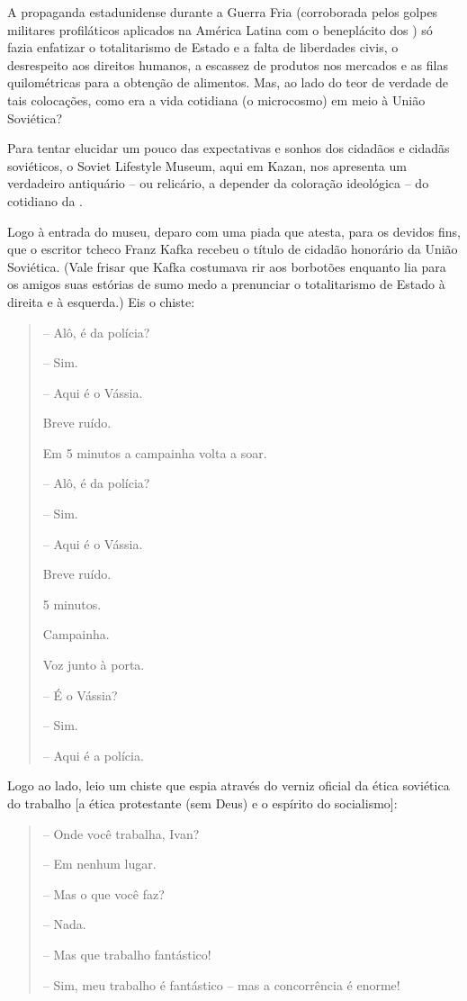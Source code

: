 A propaganda estadunidense durante a Guerra Fria (corroborada pelos
golpes militares profiláticos aplicados na América Latina com o
beneplácito dos ) só fazia enfatizar o totalitarismo de Estado e a
falta de liberdades civis, o desrespeito aos direitos humanos, a
escassez de produtos nos mercados e as filas quilométricas para a
obtenção de alimentos. Mas, ao lado do teor de verdade de tais
colocações, como era a vida cotidiana (o microcosmo) em meio à União
Soviética?

Para tentar elucidar um pouco das expectativas e sonhos dos cidadãos e
cidadãs soviéticos, o Soviet Lifestyle Museum, aqui em Kazan, nos
apresenta um verdadeiro antiquário -- ou relicário, a depender da
coloração ideológica -- do cotidiano da .

Logo à entrada do museu, deparo com uma piada que atesta, para os
devidos fins, que o escritor tcheco Franz Kafka recebeu o título de
cidadão honorário da União Soviética. (Vale frisar que Kafka costumava
rir aos borbotões enquanto lia para os amigos suas estórias de sumo medo
a prenunciar o totalitarismo de Estado à direita e à esquerda.) Eis o
chiste:

\begin{quote}
\forceindent{}-- Alô, é da polícia?

-- Sim.

-- Aqui é o Vássia.

Breve ruído.

Em 5 minutos a campainha volta a soar.

-- Alô, é da polícia?

-- Sim.

-- Aqui é o Vássia.

Breve ruído.

5 minutos.

Campainha.

Voz junto à porta.

-- É o Vássia?

-- Sim.

-- Aqui é a polícia.
\end{quote}

Logo ao lado, leio um chiste que espia através do verniz oficial da
ética soviética do trabalho {[}a ética protestante (sem Deus) e o
espírito do socialismo{]}:

\begin{quote}
\forceindent{}-- Onde você trabalha, Ivan?

-- Em nenhum lugar.

-- Mas o que você faz?

-- Nada.

-- Mas que trabalho fantástico!

-- Sim, meu trabalho é fantástico -- mas a concorrência é enorme!
\end{quote}

